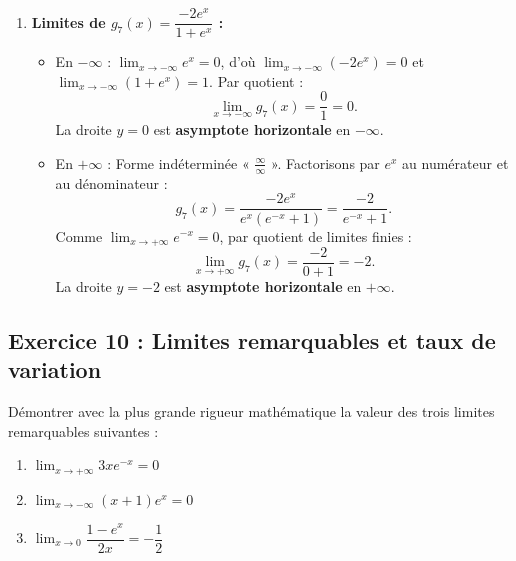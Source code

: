 \documentclass[11pt,a4paper]{article}
\begin{document}
\begin{correctionbox}[Exercice 9]
\begin{enumerate}[label=\textbf{\arabic*.}]
    \item \textbf{Limites de $g_7(x) = \dfrac{-2e^x}{1 + e^x}$ :}
    \begin{itemize}
        \item En $-\infty$ : $\lim_{x \to -\infty} e^x = 0$, d'où $\lim_{x \to -\infty} (-2e^x) = 0$ et $\lim_{x \to -\infty} (1 + e^x) = 1$.
        Par quotient :
        \[
        \boxed{\lim_{x \to -\infty} g_7(x) = \frac{0}{1} = 0}.
        \]
        La droite $y = 0$ est \textbf{asymptote horizontale} en $-\infty$.
        \item En $+\infty$ : Forme indéterminée « $\frac{\infty}{\infty}$ ».
        Factorisons par $e^x$ au numérateur et au dénominateur :
        \[
        g_7(x) = \frac{-2e^x}{e^x(e^{-x} + 1)} = \frac{-2}{e^{-x} + 1}.
        \]
        Comme $\lim_{x \to +\infty} e^{-x} = 0$, par quotient de limites finies :
        \[
        \boxed{\lim_{x \to +\infty} g_7(x) = \frac{-2}{0 + 1} = -2}.
        \]
        La droite $y = -2$ est \textbf{asymptote horizontale} en $+\infty$.
    \end{itemize}
\end{enumerate}
\end{correctionbox}

\subsection*{Exercice 10 : Limites remarquables et taux de variation}

Démontrer avec la plus grande rigueur mathématique la valeur des trois limites remarquables suivantes :
\begin{enumerate}[label=\textbf{\arabic*.}]
    \item $\lim_{x \to +\infty} 3x e^{-x} = 0$
    \item $\lim_{x \to -\infty} (x+1)e^x = 0$
    \item $\lim_{x \to 0} \dfrac{1 - e^x}{2x} = -\dfrac{1}{2}$
\end{enumerate}
\end{document}
